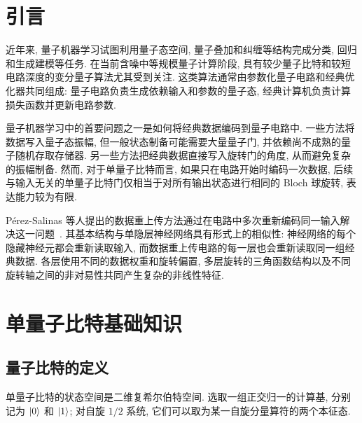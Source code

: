\documentclass[a4paper]{ctexart}
\begin{document}
\maketitle

\begin{abstract}
    本文复现 Pérez-Salinas 等人提出的数据重上传量子分类器. 该模型研究在量子比特数极少的条件下, 参数化量子电路能否完成高维, 非线性及多类别监督分类任务. 其核心思想是在量子电路的不同位置反复编码同一组经典数据, 并在相邻编码之间插入可训练旋转. 多次数据依赖旋转及其非对易复合能够产生丰富的三角函数和频率组合, 从而提高量子电路的函数表达能力.
\end{abstract}

\section{引言}

近年来, 量子机器学习试图利用量子态空间, 量子叠加和纠缠等结构完成分类, 回归和生成建模等任务. 在当前含噪中等规模量子计算阶段, 具有较少量子比特和较短电路深度的变分量子算法尤其受到关注. 这类算法通常由参数化量子电路和经典优化器共同组成: 量子电路负责生成依赖输入和参数的量子态, 经典计算机负责计算损失函数并更新电路参数.

量子机器学习中的首要问题之一是如何将经典数据编码到量子电路中. 一些方法将数据写入量子态振幅, 但一般状态制备可能需要大量量子门, 并依赖尚不成熟的量子随机存取存储器. 另一些方法把经典数据直接写入旋转门的角度, 从而避免复杂的振幅制备. 然而, 对于单量子比特而言, 如果只在电路开始时编码一次数据, 后续与输入无关的单量子比特门仅相当于对所有输出状态进行相同的 Bloch 球旋转, 表达能力较为有限.

Pérez-Salinas 等人提出的数据重上传方法通过在电路中多次重新编码同一输入解决这一问题~\cite{paper}. 其基本结构与单隐层神经网络具有形式上的相似性: 神经网络的每个隐藏神经元都会重新读取输入, 而数据重上传电路的每一层也会重新读取同一组经典数据. 各层使用不同的数据权重和旋转偏置, 多层旋转的三角函数结构以及不同旋转轴之间的非对易性共同产生复杂的非线性特征.

\section{单量子比特基础知识}

\subsection{量子比特的定义}
单量子比特的状态空间是二维复希尔伯特空间. 选取一组正交归一的计算基, 分别记为 $\ket{0}$ 和 $\ket{1}$; 对自旋 $1/2$ 系统, 它们可以取为某一自旋分量算符的两个本征态.
\end{document}
